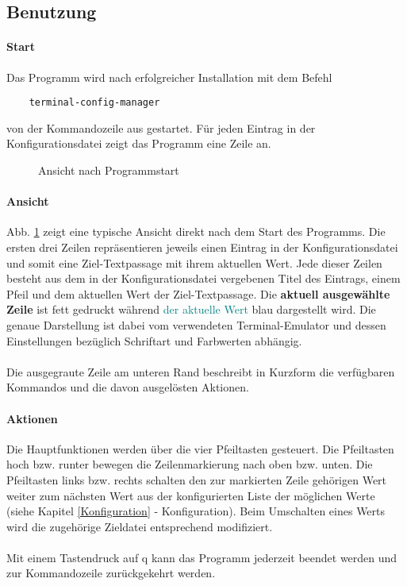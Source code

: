 \subsection{Benutzung} \label{Benutzung}
\paragraph{Start}
Das Programm wird nach erfolgreicher Installation mit dem Befehl

\begin{verbatim}
    terminal-config-manager
\end{verbatim}

von der Kommandozeile aus gestartet. Für jeden Eintrag in der Konfigurationsdatei
zeigt das Programm eine Zeile an.

\begin{figure}
    \caption{Ansicht nach Programmstart}
    \label{post-start}
    \begin{center}
    \end{center}
\end{figure}

\paragraph{Ansicht}
Abb. \ref{post-start} zeigt eine typische Ansicht direkt nach dem Start des
Programms. Die ersten drei Zeilen repräsentieren jeweils einen Eintrag in
der Konfigurationsdatei und somit eine Ziel-\gls{Textpassage} mit ihrem
aktuellen Wert. Jede dieser Zeilen besteht aus dem in der Konfigurationsdatei
vergebenen Titel des Eintrags, einem Pfeil und dem aktuellen Wert der Ziel-\gls{Textpassage}.
Die \textbf{aktuell ausgewählte Zeile} ist fett gedruckt während
\textcolor{teal}{der aktuelle Wert} blau dargestellt wird. Die genaue Darstellung
ist dabei vom verwendeten Terminal-Emulator und dessen Einstellungen bezüglich
Schriftart und Farbwerten abhängig.

\paragraph{}
Die ausgegraute Zeile am unteren Rand beschreibt in Kurzform die verfügbaren
Kommandos und die davon ausgelösten Aktionen.

\paragraph{Aktionen}
Die Hauptfunktionen werden über die vier Pfeiltasten gesteuert. Die Pfeiltasten
hoch bzw. runter bewegen die Zeilenmarkierung nach oben bzw. unten. Die Pfeiltasten
links bzw. rechts schalten den zur markierten Zeile gehörigen Wert weiter zum
nächsten Wert aus der konfigurierten Liste der möglichen Werte
(siehe Kapitel \ref{Konfiguration} - Konfiguration). Beim Umschalten eines Werts
wird die zugehörige Zieldatei entsprechend modifiziert.

\paragraph{} Mit einem Tastendruck auf q kann das Programm jederzeit beendet werden
und zur Kommandozeile zurückgekehrt werden.